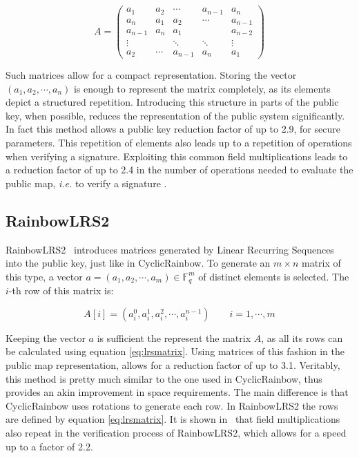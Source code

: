 \documentclass{ufsctex/ufsctex}
\begin{document}
\begin{equation}
A =
\begin{pmatrix}
a_1     & a_2    & \cdots  & a_{n-1} & a_n     \\
a_n     & a_1    & a_2     & \cdots  & a_{n-1} \\
a_{n-1} & a_n    & a_1     &         & a_{n-2} \\
\vdots  &        & \ddots  & \ddots  & \vdots  \\
a_2     & \cdots & a_{n-1} & a_n     & a_1
\end{pmatrix}
\end{equation}

Such matrices allow for a compact representation. Storing the vector $(a_1,
a_2, \cdots, a_n)$ is enough to represent the matrix completely, as its
elements depict a structured repetition. Introducing this structure in parts of
the public key, when possible, reduces the representation of the public system
significantly. In fact this method allows a public key reduction factor of up
to 2.9, for secure parameters. This repetition of elements also leads up to a
repetition of operations when verifying a signature. Exploiting this common
field multiplications leads to a reduction factor of up to 2.4 in the number of
operations needed to evaluate the public map, \textit{i.e.} to verify a
signature \cite{petzoldt2013thesis}.

\subsection{RainbowLRS2}

RainbowLRS2~\cite{petzoldt2013thesis} introduces matrices generated by Linear
Recurring Sequences into the public key, just like in CyclicRainbow. To
generate an $m \times n$ matrix of this type, a vector $a = (a_1, a_2, \cdots,
a_m) \in \mathbb{F}_q^m$ of distinct elements is selected. The $i$-th row of
this matrix is:

\begin{equation}\label{eq:lrsmatrix}
A[i] = (a_i^0, a_i^1, a_i^2, \cdots, a_i^{n-1}) \qquad i = 1, \cdots, m
\end{equation}

Keeping the vector $a$ is sufficient the represent the matrix $A$, as all its
rows can be calculated using equation \ref{eq:lrsmatrix}. Using matrices of
this fashion in the public map representation, allows for a reduction factor of
up to 3.1. Veritably, this method is pretty much similar to the one used in
CyclicRainbow, thus provides an akin improvement in space requirements. The
main difference is that CyclicRainbow uses rotations to generate each row. In
RainbowLRS2 the rows are defined by equation \ref{eq:lrsmatrix}. It is shown
in~\cite{petzoldt2013thesis} that field multiplications also repeat in the
verification process of RainbowLRS2, which allows for a speed up to a factor of
2.2.
\end{document}
